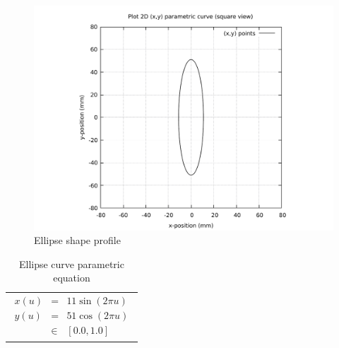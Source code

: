 
\clearpage
\pagebreak

\begin{figure}
	\caption{Ellipse shape profile}
	\label{Ellipse-curve-plot-BW.pdf}
	\centering
	\includegraphics[width=1.20\textwidth]{Chap3/curve-shape/curves/Ellipse-curve-plot-BW.pdf} 
\end{figure}

\begin{table}[ht]
\begin{center}
\begin{tabular}{ p{16.0cm} }
\caption{Ellipse curve parametric equation}
\begin{eqnarray}
	x(u) & = & 11\sin(2\pi u) \nonumber \\   
	y(u) & = & 51\cos(2\pi u) \nonumber \\
	& \in & [0.0, 1.0] \nonumber
\end{eqnarray}
\end{tabular}
\end{center}
\end{table}


\clearpage
\pagebreak


